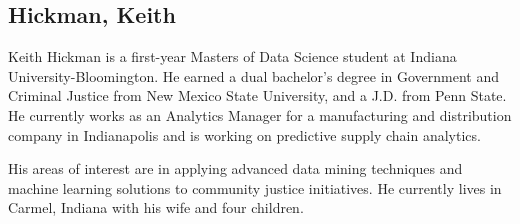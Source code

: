\subsection{Hickman, Keith}

Keith Hickman is a first-year Masters of Data Science student at Indiana University-Bloomington. He earned a dual bachelor's degree in Government and Criminal Justice from New Mexico State University, and a J.D. from Penn State. He currently works as an Analytics Manager for a manufacturing and distribution company in Indianapolis and is working on predictive supply chain analytics. 

His areas of interest are in applying advanced data mining techniques and machine learning solutions to community justice initiatives. 
He currently lives in Carmel, Indiana with his wife and four children. 

